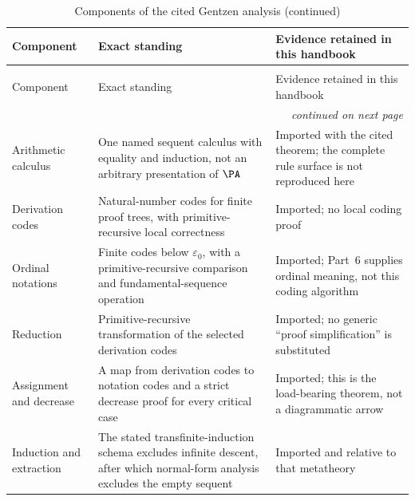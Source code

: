 \begingroup\small
\begin{longtable}{@{}p{}p{}p{}@{}}
\caption{Components of the cited Gentzen analysis.}
\label{tab:p07-gentzen-components}\\
\toprule
Component & Exact standing & Evidence retained in this handbook \\
\midrule
\endfirsthead
\caption[]{Components of the cited Gentzen analysis (continued)}\\
\toprule
Component & Exact standing & Evidence retained in this handbook \\
\midrule
\endhead
\midrule\multicolumn{3}{r}{\emph{continued on next page}}\\
\endfoot
\endlastfoot
Arithmetic calculus & One named sequent calculus with equality and induction,
not an arbitrary presentation of \(\PA\) & Imported with the cited theorem;
the complete rule surface is not reproduced here \\
Derivation codes & Natural-number codes for finite proof trees, with
primitive-recursive local correctness & Imported; no local coding proof \\
Ordinal notations & Finite codes below \(\varepsilon_0\), with a
primitive-recursive comparison and fundamental-sequence operation & Imported;
Part~6 supplies ordinal meaning, not this coding algorithm \\
Reduction & Primitive-recursive transformation of the selected derivation
codes & Imported; no generic ``proof simplification'' is substituted \\
Assignment and decrease & A map from derivation codes to notation codes and a
strict decrease proof for every critical case & Imported; this is the
load-bearing theorem, not a diagrammatic arrow \\
Induction and extraction & The stated transfinite-induction schema excludes
infinite descent, after which normal-form analysis excludes the empty sequent
& Imported and relative to that metatheory \\
\bottomrule
\end{longtable}
\endgroup

